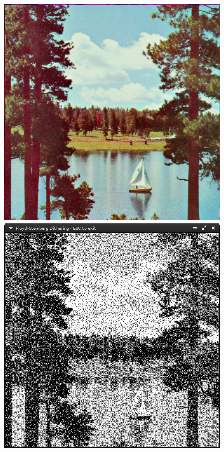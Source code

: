 \documentclass[12pt,openany,a4,usenames,dvipsnames]{book}
\begin{document}
\begin{figure}[H]
  \centering
  \begin{minipage}{0.48\textwidth}
    \includegraphics[width=\textwidth,keepaspectratio]{figures/4.2.06.jpg}
  \end{minipage}
  \hspace{.4em}
  \begin{minipage}{0.48\textwidth}
    \includegraphics[width=\textwidth,keepaspectratio]{figures/floyd_dithering_lake.png}
  \end{minipage}
\end{figure}
\end{document}
